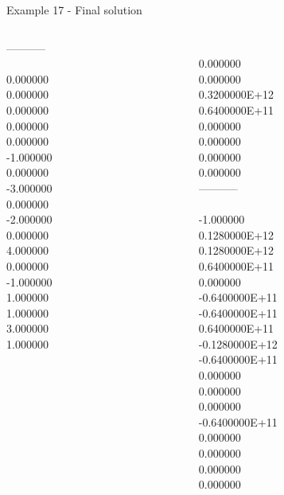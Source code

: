 \begin{frame}{Example 17 - Final solution}
\begin{columns}[t]
\begin{column}{0.3\textwidth}
-----------\\
\\
0.000000\\
0.000000\\
0.000000\\
0.000000\\
0.000000\\
-1.000000\\
0.000000\\
-3.000000\\
0.000000\\
-2.000000\\
0.000000\\
4.000000\\
0.000000\\
-1.000000\\
1.000000\\
1.000000\\
3.000000\\
1.000000\\

\end{column}  

\begin{column}{0.3\textwidth}
\\
0.000000\\
0.000000\\
0.3200000E+12\\
0.6400000E+11\\
0.000000\\
0.000000\\
0.000000\\
0.000000\\

-----------\\
\\
-1.000000\\
0.1280000E+12\\
0.1280000E+12\\
0.6400000E+11\\
0.000000\\
-0.6400000E+11\\
-0.6400000E+11\\
0.6400000E+11\\
-0.1280000E+12\\
-0.6400000E+11\\
0.000000\\
0.000000\\
0.000000\\
-0.6400000E+11\\
0.000000\\
0.000000\\
0.000000\\
0.000000\\

\end{column}
\end{columns}
\end{frame}
